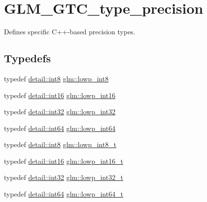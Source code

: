 \hypertarget{group__gtc__type__precision}{}\section{G\+L\+M\+\_\+\+G\+T\+C\+\_\+type\+\_\+precision}
\label{group__gtc__type__precision}


Defines specific C++-\/based precision types.  


\subsection*{Typedefs}
\begin{DoxyCompactItemize}
\item 
typedef \mbox{\hyperlink{namespaceglm_1_1detail_a04b526a8d7a9b455602a0afa78c531e0}{detail\+::int8}} \mbox{\hyperlink{group__gtc__type__precision_gaf9e675b6392764242ae87eb179e9d3d6}{glm\+::lowp\+\_\+int8}}
\item 
typedef \mbox{\hyperlink{namespaceglm_1_1detail_a375938874ca4f0a0982ec6373b56117b}{detail\+::int16}} \mbox{\hyperlink{group__gtc__type__precision_ga71fc0c399fa4780507748b643733f153}{glm\+::lowp\+\_\+int16}}
\item 
typedef \mbox{\hyperlink{namespaceglm_1_1detail_a9f85b4efeca416cdcec2fd08939a2e17}{detail\+::int32}} \mbox{\hyperlink{group__gtc__type__precision_gad9939c9d6fec1c6accc02a83c6500f08}{glm\+::lowp\+\_\+int32}}
\item 
typedef \mbox{\hyperlink{namespaceglm_1_1detail_a5b1c3227ec636c24a0676746381adfc8}{detail\+::int64}} \mbox{\hyperlink{group__gtc__type__precision_gab8a8e75af347592406e41b3ae2c0712b}{glm\+::lowp\+\_\+int64}}
\item 
typedef \mbox{\hyperlink{namespaceglm_1_1detail_a04b526a8d7a9b455602a0afa78c531e0}{detail\+::int8}} \mbox{\hyperlink{group__gtc__type__precision_gae6092311f6970a305c2df19a372360a3}{glm\+::lowp\+\_\+int8\+\_\+t}}
\item 
typedef \mbox{\hyperlink{namespaceglm_1_1detail_a375938874ca4f0a0982ec6373b56117b}{detail\+::int16}} \mbox{\hyperlink{group__gtc__type__precision_gae34c3d53c4c1434fc9f26538b0185667}{glm\+::lowp\+\_\+int16\+\_\+t}}
\item 
typedef \mbox{\hyperlink{namespaceglm_1_1detail_a9f85b4efeca416cdcec2fd08939a2e17}{detail\+::int32}} \mbox{\hyperlink{group__gtc__type__precision_gad9567c806dc39f534174eef42663119d}{glm\+::lowp\+\_\+int32\+\_\+t}}
\item 
typedef \mbox{\hyperlink{namespaceglm_1_1detail_a5b1c3227ec636c24a0676746381adfc8}{detail\+::int64}} \mbox{\hyperlink{group__gtc__type__precision_ga14d72e76d57c7f28eca8e933816c9fd6}{glm\+::lowp\+\_\+int64\+\_\+t}}

\end{DoxyCompactItemize}
